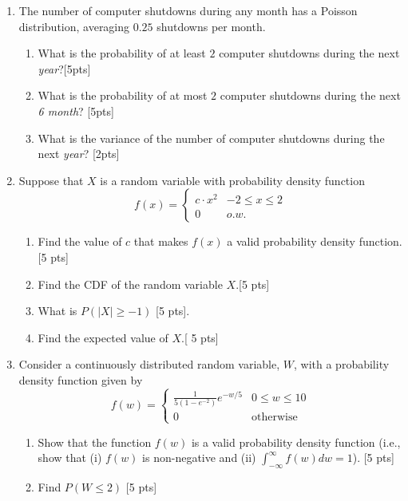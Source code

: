 \documentclass[11pt]{article}\usepackage[]{graphicx}\usepackage[]{color}
\begin{document}
\begin{enumerate}
\begin{enumerate}
	\end{enumerate}
	
	\item  The  number  of  computer  shutdowns  during  any  month  has  a  Poisson  distribution,  averaging $0.25$ shutdowns per month.
	\begin{enumerate}
	  \item What is the probability of at least $2$ computer shutdowns during the next \emph{year}?[5pts]
	  \item What is the probability of at most $2$ computer shutdowns during the next \emph{6 month}? [5pts]
	  \item What is the variance of the number of computer shutdowns during the next \emph{year}? [2pts]
	\end{enumerate}
	
	
	\item Suppose that $X$ is a random variable with probability density function $$ f(x) = \begin{cases} c \cdot x^2 & - 2 \le x \le 2 \\ 0 & o.w. \end{cases} $$
 
        \begin{enumerate}
               \item Find the value of $c$ that makes $f(x)$ a valid probability density function.[5 pts]
               
                \item Find the CDF of the random variable $X$.[5 pts]
                
                \item What is $P(\vert{X}\vert \ge {-1})$ [5 pts].
                
                \item Find the expected value of $X$.[ 5 pts]
                
        \end{enumerate}      
    	
	\item  Consider a continuously distributed random variable, $W$, with a probability density function given by 
	$$ f(w) = \begin{cases} \frac{1}{5(1 - e^{-2})} e^{-w/5} & 0 \le w \le 10 \\ 0 & \text{otherwise} \end{cases} $$
	
	    \begin{enumerate}
                  \item  Show that the function $f(w)$ is a valid probability density function (i.e., show that (i) $f(w)$ is non-negative and (ii) $\int_{-\infty}^{\infty} f(w) dw = 1$). [5 pts]
                   \item Find $P(W \le 2)$ [5 pts]
                   

\end{enumerate}
\end{enumerate}
\end{document}
